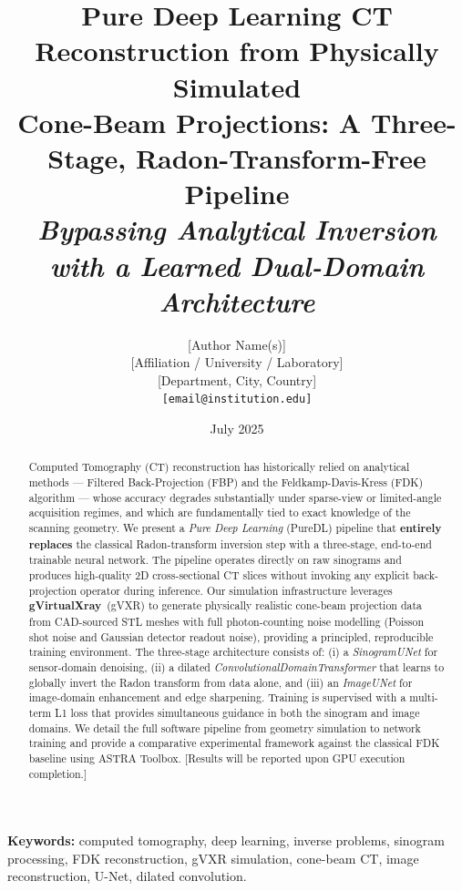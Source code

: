 \documentclass[10pt,twocolumn]{article}
\title{%
    \LARGE\bfseries
    Pure Deep Learning CT Reconstruction from Physically Simulated\\
    Cone-Beam Projections: A Three-Stage, Radon-Transform-Free Pipeline\\[4pt]
    \normalsize\mdseries
    \textit{Bypassing Analytical Inversion with a Learned Dual-Domain Architecture}
}
\author{%
    \begin{tabular}{c}
        \large [Author Name(s)] \\[2pt]
        \normalsize [Affiliation / University / Laboratory] \\
        \normalsize [Department, City, Country] \\
        \small \texttt{[email@institution.edu]}
    \end{tabular}
}
\date{July 2025}
\begin{document}

\maketitle
\thispagestyle{fancy}

\begin{abstract}
Computed Tomography (CT) reconstruction has historically relied on analytical
methods --- Filtered Back-Projection (FBP) and the Feldkamp-Davis-Kress (FDK)
algorithm --- whose accuracy degrades substantially under
sparse-view or limited-angle acquisition regimes, and which are
fundamentally tied to exact knowledge of the scanning geometry.
We present a \textit{Pure Deep Learning} (PureDL) pipeline that
\textbf{entirely replaces} the classical Radon-transform inversion step with
a three-stage, end-to-end trainable neural network.
The pipeline operates directly on raw sinograms and produces
high-quality 2D cross-sectional CT slices without invoking any
explicit back-projection operator during inference.
Our simulation infrastructure leverages \textbf{gVirtualXray}~(gVXR) to
generate physically realistic cone-beam projection data from
CAD-sourced STL meshes with full photon-counting noise modelling
(Poisson shot noise and Gaussian detector readout noise), providing a
principled, reproducible training environment.
The three-stage architecture consists of:
(i) a \textit{SinogramUNet} for sensor-domain denoising,
(ii) a dilated \textit{ConvolutionalDomainTransformer} that learns to
globally invert the Radon transform from data alone, and
(iii) an \textit{ImageUNet} for image-domain enhancement and
edge sharpening.
Training is supervised with a multi-term L1 loss that provides
simultaneous guidance in both the sinogram and image domains.
We detail the full software pipeline from geometry simulation to
network training and provide a comparative experimental framework
against the classical FDK baseline using ASTRA Toolbox.
[Results will be reported upon GPU execution completion.]
\end{abstract}

\textbf{Keywords:} computed tomography, deep learning, inverse problems,
sinogram processing, FDK reconstruction, gVXR simulation,
cone-beam CT, image reconstruction, U-Net, dilated convolution.

\end{document}
